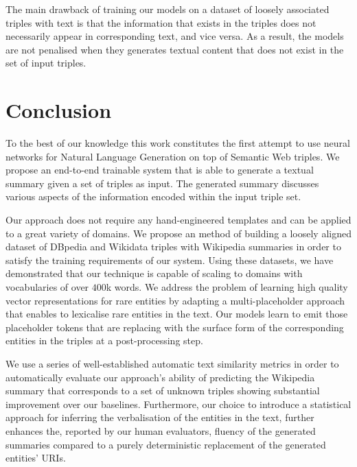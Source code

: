 \documentclass[preprint,5p]{elsarticle}
\begin{document}
The main drawback of training our models on a dataset of loosely associated triples with text is that the information that exists in the triples does not necessarily appear in corresponding text, and vice versa. As a result, the models are not penalised when they generates textual content that does not exist in the set of input triples. 





\section{Conclusion}
\label{sec:Conclusion}

To the best of our knowledge this work constitutes the first attempt to use neural networks for Natural Language Generation on top of Semantic Web triples. We propose an end-to-end trainable system that is able to generate a textual summary given a set of triples as input. The generated summary discusses various aspects of the information encoded within the input triple set.

Our approach does not require any hand-engineered templates and can be applied to a great variety of domains. We propose an method of building a loosely aligned dataset of DBpedia and Wikidata triples with Wikipedia summaries in order to satisfy the training requirements of our system. Using these datasets, we have demonstrated that our technique is capable of scaling to domains with vocabularies of over $400$k words. We address the problem of learning high quality vector representations for rare entities by adapting a multi-placeholder approach that enables to lexicalise rare entities in the text. Our models learn to emit those placeholder tokens that are replacing with the surface form of the corresponding entities in the triples at a post-processing step.

We use a series of well-established automatic text similarity metrics in order to automatically evaluate our approach's ability of predicting the Wikipedia summary that corresponds to a set of unknown triples showing substantial improvement over our baselines. Furthermore, our choice to introduce a statistical approach for inferring the verbalisation of the entities in the text, further enhances the, reported by our human evaluators, fluency of the generated summaries compared to a purely deterministic replacement of the generated entities' URIs. 




\end{document}
